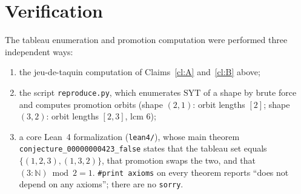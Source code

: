 \documentclass{article}
\begin{document}
\section{Verification}

The tableau enumeration and promotion computation were performed three
independent ways:
\begin{enumerate}
\item the jeu-de-taquin computation of Claims~\ref{cl:A} and~\ref{cl:B}
above;
\item the script \texttt{reproduce.py}, which enumerates $\mathrm{SYT}$ of a
shape by brute force and computes promotion orbits (shape $(2,1)$: orbit
lengths $[2]$; shape $(3,2)$: orbit lengths $[2,3]$, lcm $6$);
\item a core Lean~4 formalization (\texttt{lean4/}), whose main theorem
\texttt{conjecture\_00000000423\_false} states that the tableau set equals
$\{(1,2,3),(1,3,2)\}$, that promotion swaps the two, and that
$(3:\mathbb{N})\bmod 2 = 1$. \texttt{\#print axioms} on every theorem
reports ``does not depend on any axioms''; there are no \texttt{sorry}.
\end{enumerate}
\end{document}
